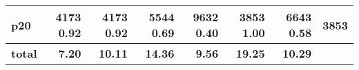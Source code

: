 \begin{tabular}{lrrrrrrr}
\multicolumn{1}{l|}{p20} & {\footnotesize 4173} \textbf{0.92} & {\footnotesize 4173} \textbf{0.92} & {\footnotesize 5544} \textbf{0.69} & {\footnotesize 9632} \textbf{0.40} & {\footnotesize 3853} \textbf{1.00} & {\footnotesize 6643} \textbf{0.58} & \multicolumn{1}{|r}{3853}\\
\midrule
\textbf{total} & \textbf{7.20} & \textbf{10.11} & \textbf{14.36} & \textbf{9.56} & \textbf{19.25} & \textbf{10.29} & \\
\bottomrule
\end{tabular}

